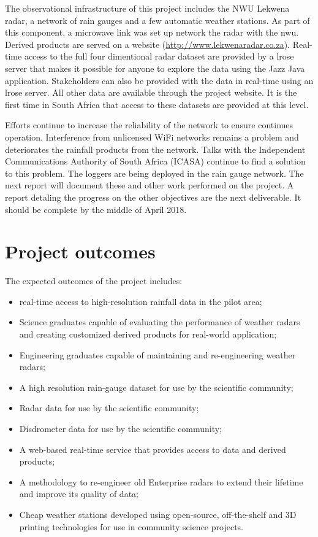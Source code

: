 \documentclass{wrcreport}
\begin{document}
The observational infrastructure of this project includes the NWU
Lekwena radar, a network of rain gauges and a few automatic weather
stations. As part of this component, a microwave link was set up
network the radar with the \gls{nwu}. Derived products are served on a
website (\url{http://www.lekwenaradar.co.za}). Real-time access to the
full four dimentional radar dataset are provided by a \gls{lrose}
server that makes it possible for anyone to explore the data using the
Jazz Java application. Stakeholders can also be provided with the data
in real-time using an \gls{lrose} server. All other data are available
through the project website. It is the first time in South Africa that
access to these datasets are provided at this level.

Efforts continue to increase the reliability of the network to ensure
continues operation. Interference from unlicensed WiFi networks
remains a problem and deteriorates the rainfall products from the
network. Talks with the Independent Communications Authority of South
Africa (ICASA) continue to find a solution to this problem. The
loggers are being deployed in the rain gauge network. The next report
will document these and other work performed on the project. A report
detaling the progress on the other objectives are the next
deliverable. It should be complete by the middle of April 2018.

%

\section{Project outcomes}

The expected outcomes of the project includes:
\begin{itemize}
\item real-time access to high-resolution rainfall data in the pilot area;
\item Science graduates capable of evaluating the performance of weather radars and creating customized derived products for real-world application;
\item Engineering graduates capable of maintaining and re-engineering weather radars;
\item A high resolution rain-gauge dataset for use by the scientific community;
\item Radar data for use by the scientific community;
\item Disdrometer data for use by the scientific community;
\item A web-based real-time service that provides access to data and derived products;
\item A methodology to re-engineer old Enterprise radars to extend their lifetime and improve its quality of data;
\item Cheap weather stations developed using open-source, off-the-shelf and 3D printing technologies for use in community science projects.
\end{itemize}

\begin{spacing}{0.3}
\linespread{0.8} \normalsize
{}

\end{spacing}
\end{document}
